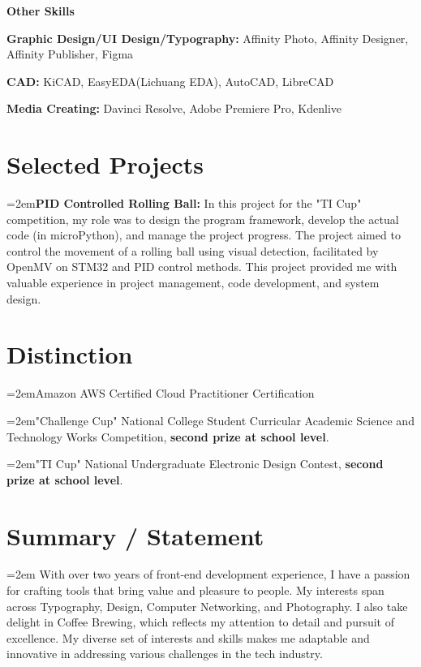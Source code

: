 \documentclass{article}
\newcommand{\cvsection}[1]{\section*{\rmfamily#1}}
\begin{document}
\textbf{Other Skills}

\hspace{2em}\textbf{Graphic Design/UI Design/Typography: }Affinity Photo, Affinity Designer, Affinity Publisher, Figma

\hspace{2em}\textbf{CAD: }KiCAD, EasyEDA(Lichuang EDA), AutoCAD, LibreCAD 

\hspace{2em}\textbf{Media Creating: }Davinci Resolve, Adobe Premiere Pro, Kdenlive

\cvsection{Selected Projects}
\indent 

\hangindent=2em\textbf{PID Controlled Rolling Ball: }In this project for the "TI Cup" competition, my role was to design the program framework, develop the actual code (in microPython), and manage the project progress. The project aimed to control the movement of a rolling ball using visual detection, facilitated by OpenMV on STM32 and PID control methods. This project provided me with valuable experience in project management, code development, and system design.






\cvsection{Distinction}
\indent

\hangindent=2emAmazon AWS Certified Cloud Practitioner Certification

\hangindent=2em"Challenge Cup" National College Student Curricular Academic Science and Technology Works Competition, \textbf{second prize at school level}.

\hangindent=2em"TI Cup" National Undergraduate Electronic Design Contest, \textbf{second prize at school level}.


\cvsection{Summary / Statement}
\indent

\hangindent=2em With over two years of front-end development experience, I have a passion for crafting tools that bring value and pleasure to people. My interests span across Typography, Design, Computer Networking, and Photography. I also take delight in Coffee Brewing, which reflects my attention to detail and pursuit of excellence. My diverse set of interests and skills makes me adaptable and innovative in addressing various challenges in the tech industry.

\end{document}
